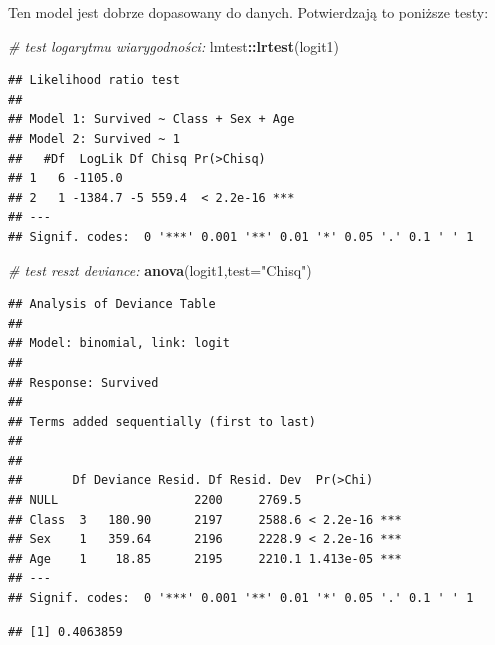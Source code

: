 \documentclass[polish,]{book}
\newenvironment{Shaded}{\begin{snugshade}}{\end{snugshade}}
\newcommand{\CommentTok}[1]{\textcolor[rgb]{0.56,0.35,0.01}{\textit{#1}}}
\newcommand{\DataTypeTok}[1]{\textcolor[rgb]{0.13,0.29,0.53}{#1}}
\newcommand{\DecValTok}[1]{\textcolor[rgb]{0.00,0.00,0.81}{#1}}
\newcommand{\KeywordTok}[1]{\textcolor[rgb]{0.13,0.29,0.53}{\textbf{#1}}}
\newcommand{\NormalTok}[1]{#1}
\newcommand{\OperatorTok}[1]{\textcolor[rgb]{0.81,0.36,0.00}{\textbf{#1}}}
\newcommand{\StringTok}[1]{\textcolor[rgb]{0.31,0.60,0.02}{#1}}
\begin{document}
Ten model jest dobrze dopasowany do danych. Potwierdzają to poniższe testy:

\begin{Shaded}
\begin{Highlighting}[]
\CommentTok{# test logarytmu wiarygodności:}
\NormalTok{lmtest}\OperatorTok{::}\KeywordTok{lrtest}\NormalTok{(logit1)}
\end{Highlighting}
\end{Shaded}

\begin{verbatim}
## Likelihood ratio test
## 
## Model 1: Survived ~ Class + Sex + Age
## Model 2: Survived ~ 1
##   #Df  LogLik Df Chisq Pr(>Chisq)    
## 1   6 -1105.0                        
## 2   1 -1384.7 -5 559.4  < 2.2e-16 ***
## ---
## Signif. codes:  0 '***' 0.001 '**' 0.01 '*' 0.05 '.' 0.1 ' ' 1
\end{verbatim}

\begin{Shaded}
\begin{Highlighting}[]
\CommentTok{# test reszt deviance:}
\KeywordTok{anova}\NormalTok{(logit1,}\DataTypeTok{test=}\StringTok{"Chisq"}\NormalTok{)}
\end{Highlighting}
\end{Shaded}

\begin{verbatim}
## Analysis of Deviance Table
## 
## Model: binomial, link: logit
## 
## Response: Survived
## 
## Terms added sequentially (first to last)
## 
## 
##       Df Deviance Resid. Df Resid. Dev  Pr(>Chi)    
## NULL                   2200     2769.5              
## Class  3   180.90      2197     2588.6 < 2.2e-16 ***
## Sex    1   359.64      2196     2228.9 < 2.2e-16 ***
## Age    1    18.85      2195     2210.1 1.413e-05 ***
## ---
## Signif. codes:  0 '***' 0.001 '**' 0.01 '*' 0.05 '.' 0.1 ' ' 1
\end{verbatim}

\begin{Shaded}
\end{Shaded}

\begin{verbatim}
## [1] 0.4063859
\end{verbatim}
\end{document}
